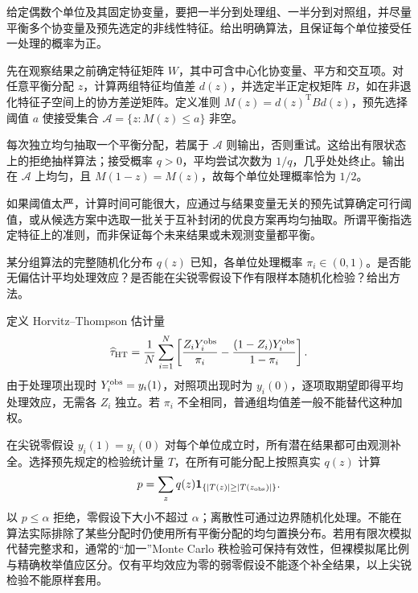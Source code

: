 \begin{example}[原题5：保持随机性的协变量平衡算法]\label{yau:2021-5}
给定偶数个单位及其固定协变量，要把一半分到处理组、一半分到对照组，并尽量平衡多个协变量及预先选定的非线性特征。给出明确算法，且保证每个单位接受任一处理的概率为正。
\end{example}
\begin{solve}
先在观察结果之前确定特征矩阵 $W$，其中可含中心化协变量、平方和交互项。对任意平衡分配 $z$，计算两组特征均值差 $d(z)$，并选定半正定权矩阵 $B$，如在非退化特征子空间上的协方差逆矩阵。定义准则 $M(z)=d(z)^{\mathrm T}Bd(z)$，预先选择阈值 $a$ 使接受集合 $\mathcal A=\{z:M(z)\le a\}$ 非空。

每次独立均匀抽取一个平衡分配，若属于 $\mathcal A$ 则输出，否则重试。这给出有限状态上的拒绝抽样算法；接受概率 $q>0$，平均尝试次数为 $1/q$，几乎处处终止。输出在 $\mathcal A$ 上均匀，且 $M(1-z)=M(z)$，故每个单位处理概率恰为 $1/2$。

如果阈值太严，计算时间可能很大，应通过与结果变量无关的预先试算确定可行阈值，或从候选方案中选取一批关于互补封闭的优良方案再均匀抽取。所谓平衡指选定特征上的准则，而非保证每个未来结果或未观测变量都平衡。
\end{solve}

\begin{example}[原题6：已知随机化机制下的估计与精确检验]\label{yau:2021-6}
某分组算法的完整随机化分布 $q(z)$ 已知，各单位处理概率 $\pi_i\in(0,1)$。是否能无偏估计平均处理效应？是否能在尖锐零假设下作有限样本随机化检验？给出方法。
\end{example}
\begin{solve}
定义 Horvitz--Thompson 估计量
\[
\widehat\tau_{\rm HT}=\frac1N\sum_{i=1}^N\left[\frac{Z_iY_i^{\rm obs}}{\pi_i}-\frac{(1-Z_i)Y_i^{\rm obs}}{1-\pi_i}\right].
\]
由于处理项出现时 $Y_i^{\rm obs}=y_i(1)$，对照项出现时为 $y_i(0)$，逐项取期望即得平均处理效应，无需各 $Z_i$ 独立。若 $\pi_i$ 不全相同，普通组均值差一般不能替代这种加权。

在尖锐零假设 $y_i(1)=y_i(0)$ 对每个单位成立时，所有潜在结果都可由观测补全。选择预先规定的检验统计量 $T$，在所有可能分配上按照真实 $q(z)$ 计算
\[
p=\sum_zq(z)\mathbf1_{\{|T(z)|\ge|T(z_{\rm obs})|\}}.
\]
以 $p\le\alpha$ 拒绝，零假设下大小不超过 $\alpha$；离散性可通过边界随机化处理。不能在算法实际排除了某些分配时仍使用所有平衡分配的均匀置换分布。若用有限次模拟代替完整求和，通常的“加一”Monte Carlo 秩检验可保持有效性，但裸模拟尾比例与精确枚举值应区分。仅有平均效应为零的弱零假设不能逐个补全结果，以上尖锐检验不能原样套用。
\end{solve}

